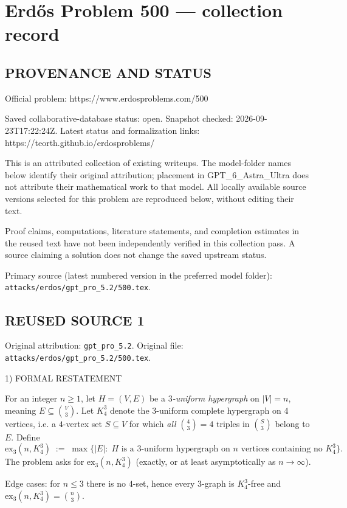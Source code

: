 \section*{Erd\H{o}s Problem 500 --- collection record}

\subsection*{PROVENANCE AND STATUS}
Official problem: https://www.erdosproblems.com/500

Saved collaborative-database status: open.
Snapshot checked: 2026-09-23T17:22:24Z.
Latest status and formalization links: https://teorth.github.io/erdosproblems/

This is an attributed collection of existing writeups. The model-folder names below identify their original attribution; placement in GPT\_6\_Astra\_Ultra does not attribute their mathematical work to that model. All locally available source versions selected for this problem are reproduced below, without editing their text.

Proof claims, computations, literature statements, and completion estimates in the reused text have not been independently verified in this collection pass. A source claiming a solution does not change the saved upstream status.

Primary source (latest numbered version in the preferred model folder): \texttt{attacks/erdos/gpt\_pro\_5.2/500.tex}.

\subsection*{REUSED SOURCE 1}
Original attribution: \texttt{gpt\_pro\_5.2}.
Original file: \texttt{attacks/erdos/gpt\_pro\_5.2/500.tex}.


1) FORMAL RESTATEMENT

For an integer $n\ge 1$, let $H=(V,E)$ be a \emph{$3$-uniform hypergraph} on $\lvert V\rvert=n$, meaning $E\subseteq \binom{V}{3}$. Let $K_4^3$ denote the $3$-uniform complete hypergraph on $4$ vertices, i.e. a $4$-vertex set $S\subseteq V$ for which \emph{all} $\binom{4}{3}=4$ triples in $\binom{S}{3}$ belong to $E$. Define
\[
\mathrm{ex}_3(n,K_4^3)\;:=\;\max\{\lvert E\rvert:\; H\text{ is a $3$-uniform hypergraph on $n$ vertices containing no }K_4^3\}.
\]
The problem asks for $\mathrm{ex}_3(n,K_4^3)$ (exactly, or at least asymptotically as $n\to\infty$).

Edge cases: for $n\le 3$ there is no $4$-set, hence every $3$-graph is $K_4^3$-free and $\mathrm{ex}_3(n,K_4^3)=\binom{n}{3}$.

